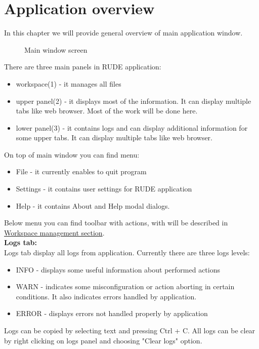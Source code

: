 \section{Application overview}\label{section:overview}

In this chapter we will provide general overview of main application window.

\begin{figure*}[!ht] 
	\centering
	\caption{Main window screen}
\end{figure*}

There are three main panels in RUDE application:
\begin{itemize}
	\item workspace(1) - it manages all files
	\item upper panel(2) - it displays most of the information. It can display multiple tabs like web browser. Most of the work will be done here.
	\item lower panel(3) - it contains logs and can display additional information for some upper tabs. It can display multiple tabs like web browser.
\end{itemize}

On top of main window you can find menu:
\begin{itemize}
	\item File - it currently enables to quit program
	\item Settings - it contains user settings for RUDE application
	\item Help - it contains About and Help modal dialogs.
\end{itemize}

Below menu you can find toolbar with actions, with will be described in \hyperref[section:workspace]{Workspace management section}.\\


\textbf{Logs tab:}\\
Logs tab display all logs from application. 
Currently there are three logs levels:
\begin{itemize}
	\item INFO - displays some useful information about performed actions
	\item WARN - indicates some misconfiguration or action aborting in certain conditions. It also indicates errors handled by application.
	\item ERROR - displays errors not handled properly by application
\end{itemize}

Logs can be copied by selecting text and pressing Ctrl + C. All logs can be clear by right clicking on logs panel and choosing "Clear logs" option.

\vfill\newpage